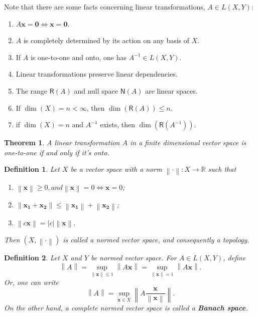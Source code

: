 \documentclass[12pt]{article}
\newtheorem{thm}{Theorem}[section]
\newtheorem{defn}{Definition}[section]
\renewcommand{\vec}[1]{\mathbf{#1}} %
\newcommand{\R}{\mathbb{R}}
\newcommand{\norm}[1]{\left\lVert#1\right\rVert}
\begin{document}
Note that there are some facts concerning linear transformations, $A \in L(X, Y)$:
\begin{enumerate}
	\item $A\textbf{x} = \textbf{0} \iff \textbf{x} = \textbf{0}$.
	\item $A$ is completely determined by its action on any basis of $X$.
	\item If $A$ is one-to-one and onto, one has $A^{-1} \in L(X, Y)$.
	\item Linear transformations preserve linear dependencies.
	\item The range $\mathsf{R}(A)$ and null space $\mathsf{N}(A)$ are linear spaces.
	\item If $\dim(X) = n < \infty$, then $\dim(\mathsf{R}(A)) \leq n$.
	\item if $\dim(X) = n$ and $A^{-1}$ exists, then $\dim(\mathsf{R}(A^{-1}))$.
\end{enumerate}

\begin{thm}
	A linear transformation $A$ in a finite dimensional vector space is one-to-one if and only if it's onto.
\end{thm}

\begin{defn}
	Let $X$ be a vector space with a norm $\norm{\cdot}: X \rightarrow \R$ such that
	\begin{enumerate}
		\item $\norm{\vec{x}} \geq 0, and \norm{\vec{x}} = 0 \iff \vec{x} = 0$;
		\item $\norm{\vec{x_1} + \vec{x_2}} \leq \norm{\vec{x_1}} + \norm{\vec{x_2}}$;
		\item $\norm{c\vec{x}} = |c| \norm{\vec{x}}$.
	\end{enumerate}
	Then $(X, \norm{\cdot})$ is called a normed vector space, and consequently a topology.
\end{defn}

\begin{defn}
	Let $X$ and $Y$ be normed vector space. For $A \in L(X, Y)$, define \[\norm{A} = \sup_{\norm{\vec{x}} \leq 1} \norm{A\vec{x}} = \sup_{\norm{\vec{x}} = 1} \norm{A\vec{x}}.\] Or, one can write \[\norm{A} =  \sup_{\vec{x} \in X} \norm{A\frac{\vec{x}}{\norm{\vec{x}}}}.\] On the other hand, a complete normed vector space is called a \textbf{Banach space}.
\end{defn}
\end{document}
